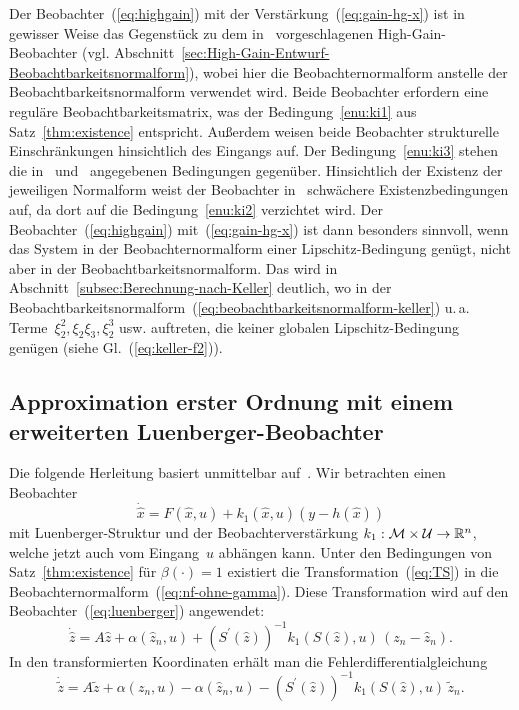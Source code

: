 \begin{remark}
Der Beobachter~(\ref{eq:highgain}) mit der Verstärkung~(\ref{eq:gain-hg-x})
ist in gewisser Weise das Gegenstück zu dem in~\cite{gauthier92,ciccarella93,dalla-mora1997}
vorgeschlagenen High-Gain-Beobachter (vgl. Abschnitt~\ref{sec:High-Gain-Entwurf-Beobachtbarkeitsnormalform}),
wobei hier die Beobachternormalform anstelle der Beobachtbarkeitsnormalform
verwendet wird. Beide Beobachter erfordern eine reguläre Beobachtbarkeitsmatrix,
was der Bedingung~\ref{enu:ki1} aus Satz~\ref{thm:existence} entspricht.
Außerdem weisen beide Beobachter strukturelle Einschränkungen hinsichtlich
des Eingangs auf. Der Bedingung~\ref{enu:ki3} stehen die in~\cite{gauthier81}
und~\cite[Sect.~{III}]{gauthier92} angegebenen Bedingungen gegenüber.
Hinsichtlich der Existenz der jeweiligen Normalform weist der Beobachter
in~\cite{gauthier92} schwächere Existenzbedingungen auf, da dort
auf die Bedingung~\ref{enu:ki2} verzichtet wird. Der Beobachter~(\ref{eq:highgain})
mit~(\ref{eq:gain-hg-x}) ist dann besonders sinnvoll, wenn das System
in der Beobachternormalform einer Lipschitz-Bedingung genügt, nicht
aber in der Beobachtbarkeitsnormalform. Das wird in Abschnitt~\ref{subsec:Berechnung-nach-Keller}
deutlich, wo in der Beobachtbarkeitsnormalform~(\ref{eq:beobachtbarkeitsnormalform-keller})
u.\,a. Terme~$\xi_{2}^{2},\xi_{2}\xi_{3},\xi_{2}^{3}$ usw. auftreten,
die keiner globalen Lipschitz-Bedingung genügen (siehe Gl.~(\ref{eq:keller-f2})).
\end{remark}

\subsection{Approximation erster Ordnung mit einem erweiterten Luen\-berger-Beobachter\label{subsec:Luenberger}}

Die folgende Herleitung basiert unmittelbar auf~\cite{bestle83,zeitz87}.
Wir betrachten einen Beobachter
\begin{equation}
\dot{\hat{x}}=F(\hat{x},u)+k_{1}(\hat{x},u)(y-h(\hat{x}))\label{eq:luenberger}
\end{equation}
mit Luenberger-Struktur und der Beobachterverstärkung $k_{1}:\mathcal{M}\times\mathcal{U}\to{\mathbb{R}}^{n}$,
welche jetzt auch vom Eingang~$u$ abhängen kann. Unter den Bedingungen
von Satz~\ref{thm:existence} für $\beta(\cdot)=1$ existiert die
Transformation~(\ref{eq:TS}) in die Beobachternormalform~(\ref{eq:nf-ohne-gamma}).
Diese Transformation wird auf den Beobachter~(\ref{eq:luenberger})
angewendet:
\[
\dot{\hat{z}}=A\hat{z}+\alpha(\hat{z}_{n},u)+\left(S^{\prime}(\hat{z})\right)^{-1}k_{1}(S(\hat{z}),u)\,(z_{n}-\hat{z}_{n}).
\]
In den transformierten Koordinaten erhält man die Fehlerdifferentialgleichung
\begin{equation}
\dot{\tilde{z}}=A\tilde{z}+\alpha(z_{n},u)-\alpha(\hat{z}_{n},u)-\left(S^{\prime}(\hat{z})\right)^{-1}k_{1}(S(\hat{z}),u)\,\tilde{z}_{n}.\label{eq:error-luen1}
\end{equation}

